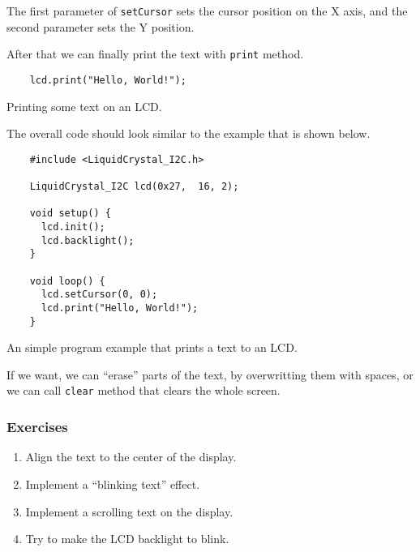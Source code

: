 \documentclass[../sparc.tex]{subfiles}
\begin{document}
The first parameter of \texttt{setCursor} sets the cursor position on
the X axis, and the second parameter sets the Y position.

After that we can finally print the text with \texttt{print} method.

\begin{listing}[ht]
  \begin{verbatim}
    lcd.print("Hello, World!");
  \end{verbatim}
  \caption{Printing some text on an LCD.}
  \label{listing:game-dev-lcd-print}
\end{listing}

The overall code should look similar to the example that is shown below.

\begin{listing}[H]
  \begin{verbatim}
    #include <LiquidCrystal_I2C.h>

    LiquidCrystal_I2C lcd(0x27,  16, 2);

    void setup() {
      lcd.init();
      lcd.backlight();
    }

    void loop() {
      lcd.setCursor(0, 0);
      lcd.print("Hello, World!");
    }
  \end{verbatim}
  \caption{An simple program example that prints a text to an LCD.}
  \label{listing:game-dev-lcd-example-00}
\end{listing}

If we want, we can ``erase'' parts of the text, by overwritting them with
spaces, or we can call \texttt{clear} method that clears the whole
screen.

\subsubsection{Exercises}

\begin{enumerate}
\item Align the text to the center of the display.
\item Implement a ``blinking text'' effect.
\item Implement a scrolling text on the display.
\item Try to make the LCD backlight to blink.
\end{enumerate}
\end{document}
